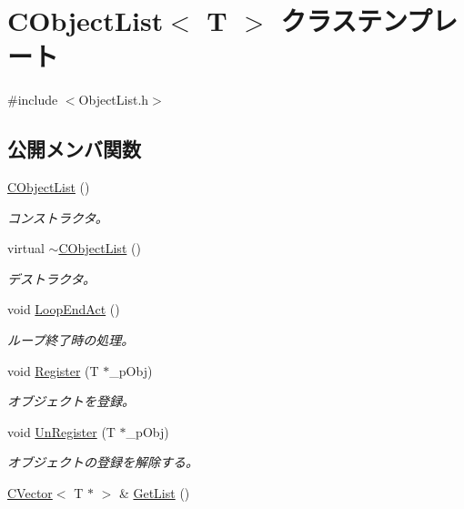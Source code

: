 \hypertarget{class_c_object_list}{}\section{C\+Object\+List$<$ T $>$ クラステンプレート}
\label{class_c_object_list}


{\ttfamily \#include $<$Object\+List.\+h$>$}

\subsection*{公開メンバ関数}
\begin{DoxyCompactItemize}
\item 
\hyperlink{class_c_object_list_a577198dc90a4a0a6b6a5b0f15001542d}{C\+Object\+List} ()
\begin{DoxyCompactList}\small\item\em コンストラクタ。 \end{DoxyCompactList}\item 
virtual \hyperlink{class_c_object_list_af6d97cee4b4f55a4bf680c79e6e50fe2}{$\sim$\+C\+Object\+List} ()
\begin{DoxyCompactList}\small\item\em デストラクタ。 \end{DoxyCompactList}\item 
void \hyperlink{class_c_object_list_a327f2ed43bab6e49fe6fc8e4b76642d6}{Loop\+End\+Act} ()
\begin{DoxyCompactList}\small\item\em ループ終了時の処理。 \end{DoxyCompactList}\item 
void \hyperlink{class_c_object_list_a103a863daa1977b9cb2b3aca699194b4}{Register} (T $\ast$\+\_\+p\+Obj)
\begin{DoxyCompactList}\small\item\em オブジェクトを登録。 \end{DoxyCompactList}\item 
void \hyperlink{class_c_object_list_a15d44299ea86606b641b937041b40bbe}{Un\+Register} (T $\ast$\+\_\+p\+Obj)
\begin{DoxyCompactList}\small\item\em オブジェクトの登録を解除する。 \end{DoxyCompactList}\item 
\hyperlink{_list_8h_af54c38acd8944230f18792ac38211526}{C\+Vector}$<$ T $\ast$ $>$ \& \hyperlink{class_c_object_list_a9e035ac0cb23b5f208374550bca1c705}{Get\+List} ()
\end{DoxyCompactItemize}
